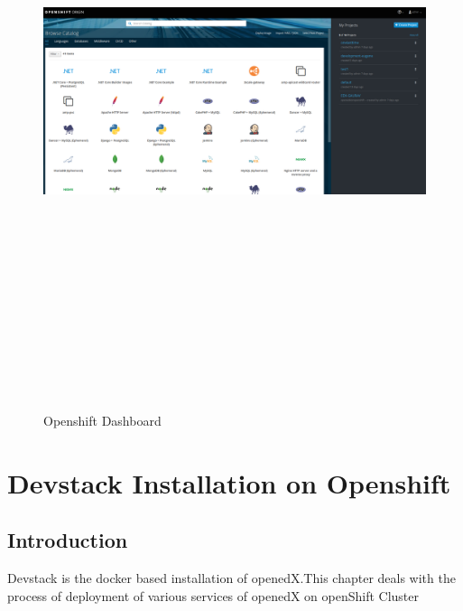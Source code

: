 \documentclass[11pt]{report}
\begin{document}
	\begin{figure}[h!]
    	\begin{center}
    	   \includegraphics[width=18cm,height=18cm]{openshiftDashboard.png}
    		\caption{Openshift Dashboard}
    	  \end{center}
	  
	\end{figure}
	
	\chapter{Devstack Installation on Openshift}
	\section{Introduction}
	\large
	Devstack is the docker based installation of openedX.This chapter deals with the process of deployment of various services of openedX on openShift Cluster 
	
\end{document}
